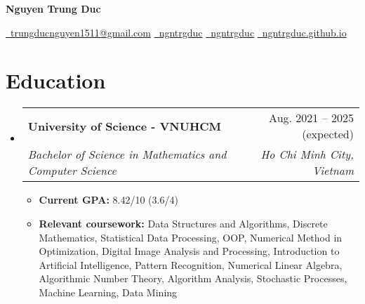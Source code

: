 \documentclass[letterpaper,11pt]{article}
\makeatletter
\newcommand{\heading}[4]{
    \normalsize
    \begin{tabular*}{0.97\textwidth}[t]{l@{\extracolsep{\fill}}r}
      \textbf{#1} & #2 \\[-2pt]
      \textit{\small#3} & \textit{\small #4}
    \end{tabular*}
    \vspace{-2pt}
}
\makeatother
\begin{document}
\begin{center}
    {\Huge \textbf{Nguyen Trung Duc}} \\
    \vspace{0.7em}
    
    \href{mailto:trungducnguyen1511@gmail.com}{\faEnvelope\ trungducnguyen1511@gmail.com} \quad
    \href{https://www.linkedin.com/in/ngntrgduc/}{\faLinkedin\ {ngntrgduc}} \quad
    \href{https://github.com/ngntrgduc}{\faGithub\ {ngntrgduc}} \quad
    \href{https://ngntrgduc.github.io/}{\faHome\ {ngntrgduc.github.io}} 
    
\end{center}




\section{Education}
    \begin{itemize}
        \item \heading{University of Science - VNUHCM}{Aug. 2021 -- 2025 (expected)}
          {Bachelor of Science in Mathematics and Computer Science}{Ho Chi Minh City, Vietnam}
        \begin{itemize}
            \item \textbf{Current GPA:} 8.42/10 (3.6/4)
            \item \textbf{Relevant coursework:}
            Data Structures and Algorithms, 
            Discrete Mathematics, 
            Statistical Data Processing, 
            OOP,
            Numerical Method in Optimization, 
            Digital Image Analysis and Processing,
            Introduction to Artificial Intelligence,
            Pattern Recognition,
            Numerical Linear Algebra,
            Algorithmic Number Theory,
            Algorithm Analysis,
            Stochastic Processes,
            Machine Learning,
            Data Mining
        \end{itemize}
  \end{itemize}
\end{document}
